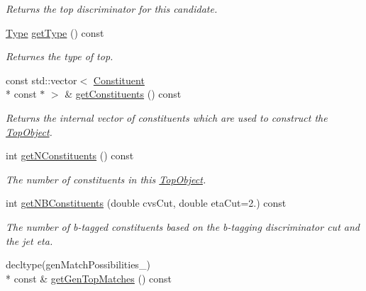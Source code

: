 \begin{DoxyCompactItemize}
\begin{DoxyCompactList}\small\item\em Returns the top discriminator for this candidate. \end{DoxyCompactList}\item 
\hypertarget{classTopObject_a74f6fdda7a11b18b599c4a37294d26b9}{\hyperlink{classTopObject_af82a20e421c29bc667af7cd73fc46ba4}{Type} \hyperlink{classTopObject_a74f6fdda7a11b18b599c4a37294d26b9}{get\-Type} () const }\label{classTopObject_a74f6fdda7a11b18b599c4a37294d26b9}

\begin{DoxyCompactList}\small\item\em Returnes the type of top. \end{DoxyCompactList}\item 
\hypertarget{classTopObject_a3bd54d089da20318d1733c2d4e28493a}{const std\-::vector$<$ \hyperlink{classConstituent}{Constituent} \\*
const $\ast$ $>$ \& \hyperlink{classTopObject_a3bd54d089da20318d1733c2d4e28493a}{get\-Constituents} () const }\label{classTopObject_a3bd54d089da20318d1733c2d4e28493a}

\begin{DoxyCompactList}\small\item\em Returns the internal vector of constituents which are used to construct the \hyperlink{classTopObject}{Top\-Object}. \end{DoxyCompactList}\item 
\hypertarget{classTopObject_a562bafee171bf66c283d519c8021672d}{int \hyperlink{classTopObject_a562bafee171bf66c283d519c8021672d}{get\-N\-Constituents} () const }\label{classTopObject_a562bafee171bf66c283d519c8021672d}

\begin{DoxyCompactList}\small\item\em The number of constituents in this \hyperlink{classTopObject}{Top\-Object}. \end{DoxyCompactList}\item 
\hypertarget{classTopObject_a2b5bb6b014c80262b748171698ba1042}{int \hyperlink{classTopObject_a2b5bb6b014c80262b748171698ba1042}{get\-N\-B\-Constituents} (double cvs\-Cut, double eta\-Cut=2.) const }\label{classTopObject_a2b5bb6b014c80262b748171698ba1042}

\begin{DoxyCompactList}\small\item\em The number of b-\/tagged constituents based on the b-\/tagging discriminator cut and the jet eta. \end{DoxyCompactList}\item 
\hypertarget{classTopObject_a51cc6fbaacb2cf502cad0b57d99ae91f}{decltype(gen\-Match\-Possibilities\-\_\-) \\*
const \& \hyperlink{classTopObject_a51cc6fbaacb2cf502cad0b57d99ae91f}{get\-Gen\-Top\-Matches} () const }\label{classTopObject_a51cc6fbaacb2cf502cad0b57d99ae91f}


\end{DoxyCompactItemize}
